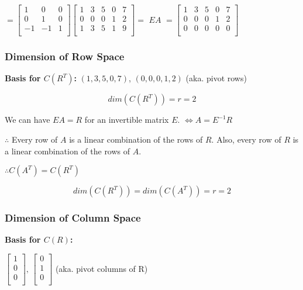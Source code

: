 \documentclass[12pt,a4paper]{article}
\begin{document}
$ 
= 
\begin{bmatrix}
  1 & 0 & 0 \\
  0 & 1 & 0 \\
  -1 & -1 & 1 \\
\end{bmatrix}
\begin{bmatrix}
  1 & 3 & 5 & 0 & 7 \\
  0 & 0 & 0 & 1 & 2 \\
  1 & 3 & 5 & 1 & 9 \\
\end{bmatrix}
= 
$
\textcolor{orange!100}{$EA$}
$
=
\begin{bmatrix}
  \boxed{1} & 3 & 5 & 0 & 7 \\
  0 & 0 & 0 & \boxed{1} & 2 \\
  0 & 0 & 0 & 0 & 0 \\
\end{bmatrix}
$

\subsubsection*{Dimension of Row Space}

\textbf{Basis for $C(R^T)$:} $(1,3,5,0,7)$, $(0,0,0,1,2)$ (aka. pivot rows)

\[dim(C(R^T)) = r = 2\]

We can have $EA = R$ for an invertible matrix $E$. $\iff A = E^{-1}R$

$\therefore$ Every row of $A$ is a linear combination of the rows of $R$.
Also, every row of $R$ is a linear combination of the rows of $A$.

$\therefore C(A^T) = C(R^T)$

\[dim(C(R^T)) = dim(C(A^T)) = r = 2\]

\subsubsection*{Dimension of Column Space}

\textbf{Basis for $C(R)$:}

$
\begin{bmatrix}
  1 \\
  0 \\
  0 \\
\end{bmatrix},\,
\begin{bmatrix}
  0 \\
  1 \\
  0 \\
\end{bmatrix}
$ (aka. pivot columns of R)
\end{document}

